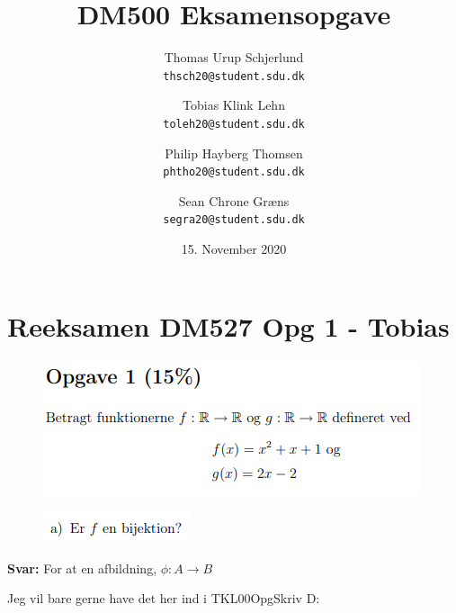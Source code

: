 \documentclass{article}
\title{DM500 Eksamensopgave}
\author{
	Thomas Urup Schjerlund\\
	\texttt{thsch20@student.sdu.dk}
	\and
	Tobias Klink Lehn\\
	\texttt{toleh20@student.sdu.dk}
	\and
	Philip Hayberg Thomsen\\
	\texttt{phtho20@student.sdu.dk}
	\and
	Sean Chrone Græns\\
	\texttt{segra20@student.sdu.dk}
}
\date{15. November 2020}
\begin{document}
\begin{titlepage}
\maketitle
\end{titlepage}

\section{Reeksamen DM527 Opg 1 - Tobias}
\begin{figure}[h]
\includegraphics[scale=1]{Opgave1Formulering}
\end{figure}

\begin{figure}[h]
\includegraphics[scale=1]{opga}
\end{figure}
\textbf{Svar:}
For at en afbildning, $\phi: A \rightarrow B$


Jeg vil bare gerne have det her ind i TKL00OpgSkriv D:
\end{document}
